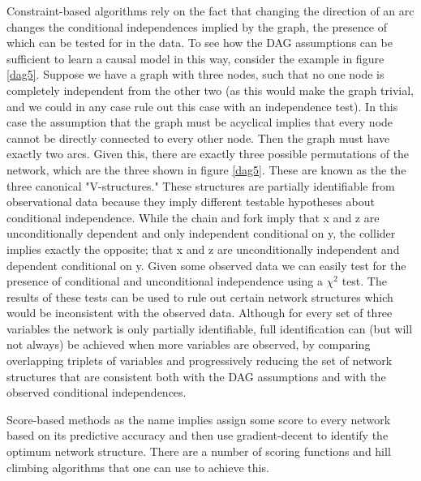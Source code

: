 \documentclass{article}
\begin{document}
Constraint-based algorithms rely on the fact that changing the direction of an arc changes the conditional independences implied by the graph, the presence of which can be tested for in the data. To see how the DAG assumptions can be sufficient to learn a causal model in this way, consider the example in figure \ref{dag5}. Suppose we have a graph with three nodes, such that no one node is completely independent from the other two (as this would make the graph trivial, and we could in any case rule out this case with an independence test). In this case the assumption that the graph must be acyclical implies that every node cannot be directly connected to every other node. Then the graph must have exactly two arcs. Given this, there are exactly three possible permutations of the network, which are the three shown in figure \ref{dag5}. These are known as the the three canonical "V-structures." \parencite{pearl2009causality} These structures are partially identifiable from observational data because they imply different testable hypotheses about conditional independence. While the chain and fork imply that x and z are unconditionally dependent and only independent conditional on y, the collider implies exactly the opposite; that x and z are unconditionally independent and dependent conditional on y. Given some observed data we can easily test for the presence of conditional and unconditional independence using a $\chi^2$ test. The results of these tests can be used to rule out certain network structures which would be inconsistent with the observed data. Although for every set of three variables the network is only partially identifiable, full identification can (but will not always) be achieved when more variables are observed, by comparing overlapping triplets of variables and progressively reducing the set of network structures that are consistent both with the DAG assumptions and with the observed conditional independences.

Score-based methods as the name implies assign some score to every network based on its predictive accuracy and then use gradient-decent to identify the optimum network structure. There are a number of scoring functions and hill climbing algorithms that one can use to achieve this. 
\end{document}

